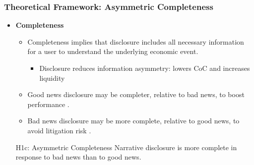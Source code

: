\documentclass{beamer}
\begin{document}
\begin{frame}
\frametitle{Theoretical Framework: Asymmetric Completeness}
\begin{itemize}
	\item \textbf{Completeness}
	
	\begin{itemize}
		\item Completeness implies that disclosure includes all necessary information for a user to understand the underlying economic event.
		\begin{itemize}
			\item Disclosure reduces information asymmetry: lowers CoC and increases liquidity \citep{diamondDisclosureLiquidityCost1991,diamondOptimalReleaseInformation1985,leuzEconomicConsequencesIncreased2000}
		\end{itemize}
		
		\item Good news disclosure may be completer, relative to bad news, to boost performance \citep{teohEarningsManagementUnderperformance1998, langVoluntaryDisclosureEquity2000}.
		\item Bad news disclosure may be more complete, relative to good news, to avoid litigation risk \citep{skinnerWhyFirmsVoluntarily1994, skinnerEarningsDisclosuresStockholder1997,marinovicNoNewsGood2016}.
	\end{itemize}
	
	\medskip
	\pause
	\begin{block}{H1c: Asymmetric Completeness}
		Narrative disclosure is more complete in response to bad news than to good news.
	\end{block}
	
	
\end{itemize}
\end{frame}
%
%
\end{document}

